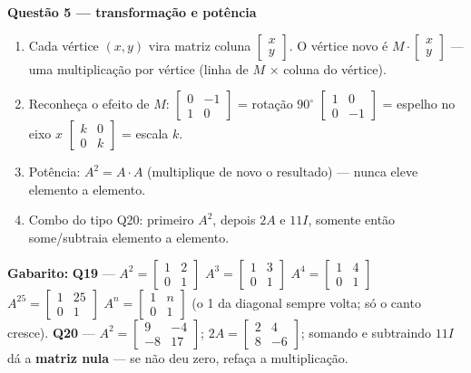 \documentclass[11pt]{article}
\begin{document}
\begin{metodobox}
\textbf{\color{tealdeep}Questão 5 — transformação e potência}
\begin{enumerate}[label=\arabic*., leftmargin=1.6em]
  \item Cada vértice $(x, y)$ vira matriz coluna $\begin{bmatrix} x \\ y \end{bmatrix}$. O vértice novo é $M\cdot\begin{bmatrix} x \\ y \end{bmatrix}$ — uma multiplicação por vértice (linha de $M$ $\times$ coluna do vértice).
  \item Reconheça o efeito de $M$: $\begin{bmatrix} 0 & -1 \\ 1 & 0 \end{bmatrix}$ = rotação $90^{\circ}$ \quad $\begin{bmatrix} 1 & 0 \\ 0 & -1 \end{bmatrix}$ = espelho no eixo $x$ \quad $\begin{bmatrix} k & 0 \\ 0 & k \end{bmatrix}$ = escala $k$.
  \item Potência: $A^{2}=A\cdot A$ (multiplique de novo o resultado) — nunca eleve elemento a elemento.
  \item Combo do tipo Q20: primeiro $A^{2}$, depois $2A$ e $11I$, somente então some/subtraia elemento a elemento.
\end{enumerate}
\textbf{Gabarito:} \textbf{Q19} — $A^{2}=\begin{bmatrix} 1 & 2 \\ 0 & 1 \end{bmatrix}$ \; $A^{3}=\begin{bmatrix} 1 & 3 \\ 0 & 1 \end{bmatrix}$ \; $A^{4}=\begin{bmatrix} 1 & 4 \\ 0 & 1 \end{bmatrix}$ \; $A^{25}=\begin{bmatrix} 1 & 25 \\ 0 & 1 \end{bmatrix}$ \; $A^{n}=\begin{bmatrix} 1 & n \\ 0 & 1 \end{bmatrix}$ (o 1 da diagonal sempre volta; só o canto cresce). \quad \textbf{Q20} — $A^{2}=\begin{bmatrix} 9 & -4 \\ -8 & 17 \end{bmatrix}$; $2A=\begin{bmatrix} 2 & 4 \\ 8 & -6 \end{bmatrix}$; somando e subtraindo $11I$ dá a \textbf{matriz nula} — se não deu zero, refaça a multiplicação.
\end{metodobox}
\end{document}
